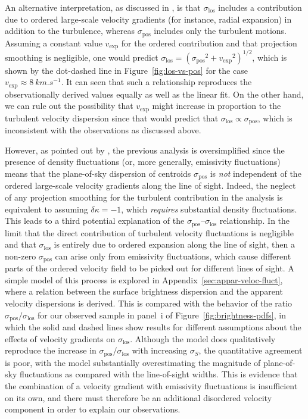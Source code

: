 \documentclass[fleqn,usenatbib, useAMS, a4paper]{mnras}
\newcommand\pos{\ensuremath{_{\mathrm{pos}}}}
\newcommand\los{\ensuremath{_{\mathrm{los}}}}
\begin{document}
\newcommand\vexp{\ensuremath{v_{\text{exp}}}}
An alternative interpretation,
as discussed in \citet{2011MNRAS.413..705L},
is that \(\sigma\los\) includes a contribution due to
ordered large-scale velocity gradients
(for instance, radial expansion)
in addition to the turbulence,
whereas \(\sigma\pos\) includes only the turbulent motions. 
Assuming a constant value \vexp{} for the ordered contribution
and that projection smoothing is negligible,
one would predict \(\sigma\los = (\sigma\pos^2 + \vexp^2)^{1/2}\),
which is shown by the dot-dashed line in Figure~\ref{fig:los-vs-pos}
for the case \(\vexp \approx \SI{8}{km.s^{-1}}\).
It can seen that such a relationship reproduces the 
observationally derived values equally as well as the linear fit.
On the other hand, we can rule out the possibility that
\vexp{} might increase in proportion to the turbulent velocity dispersion
since that would predict that \(\sigma\los \propto \sigma\pos\),
which is inconsistent with the observations as discussed above.

However, as pointed out by \citet{arthur2016turbulence},
the previous analysis is oversimplified since the presence
of density fluctuations (or, more generally, emissivity fluctuations)
means that the plane-of-sky dispersion of centroids \(\sigma\pos\)
is \emph{not} independent of the 
ordered large-scale velocity gradients along the line of sight.
Indeed, the neglect of any projection smoothing for the turbulent contribution
in the \citeauthor{2011MNRAS.413..705L} analysis is equivalent to
assuming \(\delta\kappa = -1\), which \emph{requires} substantial density fluctuations. 
This leads to a third potential explanation of the
\(\sigma\pos\)--\(\sigma\los\) relationship.
In the limit that the direct contribution of
turbulent velocity fluctuations is negligible
and that \(\sigma\los\) is entirely due to ordered expansion along the line of sight,
then a non-zero \(\sigma\pos\) can arise only from emissivity fluctuations,
which cause different parts of the ordered velocity field to be picked out
for different lines of sight.
A simple model of this process is explored in Appendix~\ref{sec:appar-veloc-fluct},
where a relation between the surface brightness dispersion and the apparent
velocity dispersions is derived.
This is compared with the behavior of the ratio
\(\sigma\pos / \sigma\los\) for
our observed sample in panel~i of Figure~\ref{fig:brightness-pdfs},
in which the solid and dashed lines show results for different assumptions
about the effects of velocity gradients on \(\sigma\los\).
Although the model does qualitatively reproduce the increase
in \(\sigma\pos / \sigma\los\) with increasing \(\sigma_S\), the quantitative agreement
is poor, with the model substantially overestimating the magnitude of
plane-of-sky fluctuations as compared with the line-of-sight widths.
This is evidence that the combination of a velocity gradient with
emissivity fluctuations is insufficient on its own,
and there must therefore be an additional disordered velocity component
in order to explain our observations.
\end{document}
